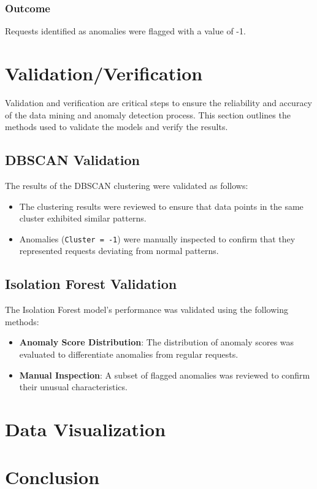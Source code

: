 \subsubsection{Outcome}
Requests identified as anomalies were flagged with a value of -1.

\section{Validation/Verification}
Validation and verification are critical steps to ensure the reliability and accuracy of the data mining and anomaly detection process. This section outlines the methods used to validate the models and verify the results.

\subsection{DBSCAN Validation}
The results of the DBSCAN clustering were validated as follows:
\begin{itemize}
	\item The clustering results were reviewed to ensure that data points in the same cluster exhibited similar patterns.
	\item Anomalies (\texttt{Cluster = -1}) were manually inspected to confirm that they represented requests deviating from normal patterns.
\end{itemize}

\subsection{Isolation Forest Validation}
The Isolation Forest model's performance was validated using the following methods:
\begin{itemize}
	\item \textbf{Anomaly Score Distribution}: The distribution of anomaly scores was evaluated to differentiate anomalies from regular requests.
	\item \textbf{Manual Inspection}: A subset of flagged anomalies was reviewed to confirm their unusual characteristics.
\end{itemize}

\section{Data Visualization}

\section{Conclusion}

